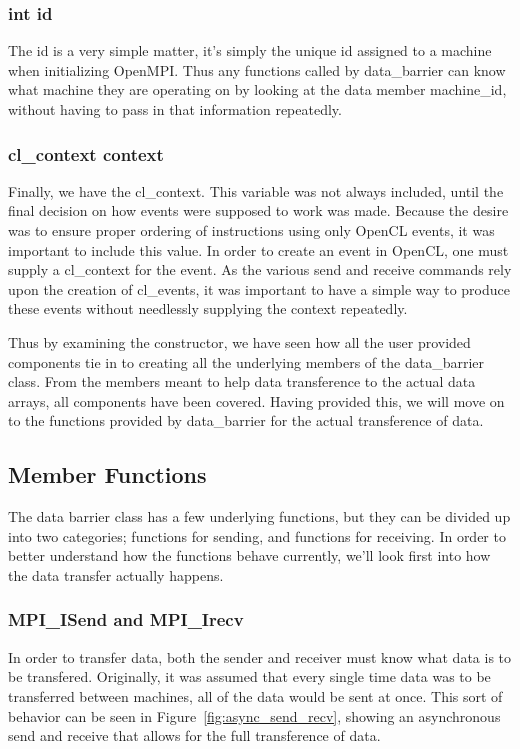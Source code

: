 \documentclass[../thesis.tex]{subfiles}
\begin{document}
  \subsubsection{int id} %
  \label{ssub:int_id}
    The id is a very simple matter, it's simply the unique id assigned to a machine when initializing OpenMPI. Thus any functions called by data\_barrier can know what machine they are operating on by looking at the data member machine\_id, without having to pass in that information repeatedly.

  \subsubsection{cl\_context context} %
  \label{ssub:cl_context_context}
    Finally, we have the cl\_context. This variable was not always included, until the final decision on how events were supposed to work was made. Because the desire was to ensure proper ordering of instructions using only OpenCL events, it was important to include this value. In order to create an event in OpenCL, one must supply a cl\_context for the event. As the various send and receive commands rely upon the creation of cl\_events, it was important to have a simple way to produce these events without needlessly supplying the context repeatedly.

  Thus by examining the constructor, we have seen how all the user provided components tie in to creating all the underlying members of the data\_barrier class. From the members meant to help data transference to the actual data arrays, all components have been covered. Having provided this, we will move on to the functions provided by data\_barrier for the actual transference of data.

\subsection{Member Functions} %
\label{sub:member_functions}
  The data barrier class has a few underlying functions, but they can be divided up into two categories; functions for sending, and functions for receiving. In order to better understand how the functions behave currently, we'll look first into how the data transfer actually happens.

  \subsubsection{MPI\_ISend and MPI\_Irecv} %
  \label{ssub:mpisend_and_mpi_recv}
    In order to transfer data, both the sender and receiver must know what data is to be transfered. Originally, it was assumed that every single time data was to be transferred between machines, all of the data would be sent at once. This sort of behavior can be seen in Figure~\ref{fig:async_send_recv}, showing an asynchronous send and receive that allows for the full transference of data.
\end{document}
